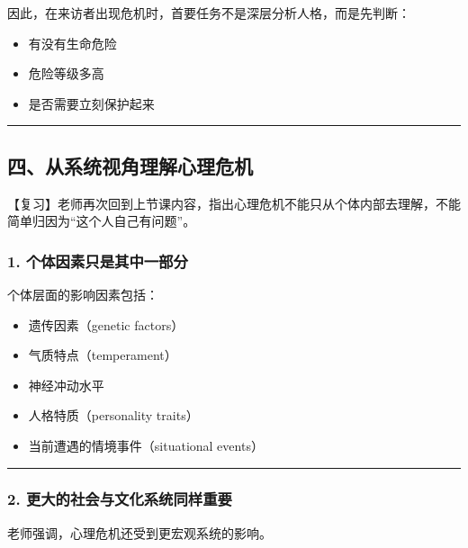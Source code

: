 \documentclass[
  chinese,
  9pt,
  a4paper,
]{ctexart}
\providecommand{\tightlist}{%
  \setlength{\itemsep}{0pt}\setlength{\parskip}{0pt}}
\begin{document}
因此，在来访者出现危机时，首要任务不是深层分析人格，而是先判断：

\begin{itemize}
\tightlist
\item
  有没有生命危险
\item
  危险等级多高
\item
  是否需要立刻保护起来
\end{itemize}

\begin{center}\rule{0.5\linewidth}{0.5pt}\end{center}

\subsection{四、从系统视角理解心理危机}\label{ux56dbux4eceux7cfbux7edfux89c6ux89d2ux7406ux89e3ux5fc3ux7406ux5371ux673a}

【复习】老师再次回到上节课内容，指出心理危机不能只从个体内部去理解，不能简单归因为``这个人自己有问题''。

\subsubsection{1.
个体因素只是其中一部分}\label{ux4e2aux4f53ux56e0ux7d20ux53eaux662fux5176ux4e2dux4e00ux90e8ux5206}

个体层面的影响因素包括：

\begin{itemize}
\tightlist
\item
  遗传因素（genetic factors）
\item
  气质特点（temperament）
\item
  神经冲动水平
\item
  人格特质（personality traits）
\item
  当前遭遇的情境事件（situational events）
\end{itemize}

\begin{center}\rule{0.5\linewidth}{0.5pt}\end{center}

\subsubsection{2.
更大的社会与文化系统同样重要}\label{ux66f4ux5927ux7684ux793eux4f1aux4e0eux6587ux5316ux7cfbux7edfux540cux6837ux91cdux8981}

老师强调，心理危机还受到更宏观系统的影响。
\end{document}
